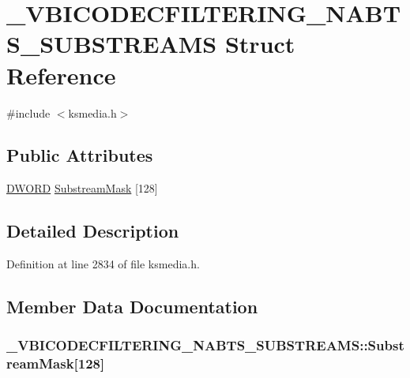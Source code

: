 \hypertarget{struct___v_b_i_c_o_d_e_c_f_i_l_t_e_r_i_n_g___n_a_b_t_s___s_u_b_s_t_r_e_a_m_s}{}\section{\+\_\+\+V\+B\+I\+C\+O\+D\+E\+C\+F\+I\+L\+T\+E\+R\+I\+N\+G\+\_\+\+N\+A\+B\+T\+S\+\_\+\+S\+U\+B\+S\+T\+R\+E\+A\+MS Struct Reference}
\label{struct___v_b_i_c_o_d_e_c_f_i_l_t_e_r_i_n_g___n_a_b_t_s___s_u_b_s_t_r_e_a_m_s}


{\ttfamily \#include $<$ksmedia.\+h$>$}

\subsection*{Public Attributes}
\begin{DoxyCompactItemize}
\item 
\hyperlink{mapinls_8h_ad342ac907eb044443153a22f964bf0af}{D\+W\+O\+RD} \hyperlink{struct___v_b_i_c_o_d_e_c_f_i_l_t_e_r_i_n_g___n_a_b_t_s___s_u_b_s_t_r_e_a_m_s_a9233ff314bd529645107c55860d67ee5}{Substream\+Mask} \mbox{[}128\mbox{]}
\end{DoxyCompactItemize}


\subsection{Detailed Description}


Definition at line 2834 of file ksmedia.\+h.



\subsection{Member Data Documentation}
\subsubsection[{\texorpdfstring{Substream\+Mask}{SubstreamMask}}]{ \+\_\+\+V\+B\+I\+C\+O\+D\+E\+C\+F\+I\+L\+T\+E\+R\+I\+N\+G\+\_\+\+N\+A\+B\+T\+S\+\_\+\+S\+U\+B\+S\+T\+R\+E\+A\+M\+S\+::\+Substream\+Mask\mbox{[}128\mbox{]}}\hypertarget{struct___v_b_i_c_o_d_e_c_f_i_l_t_e_r_i_n_g___n_a_b_t_s___s_u_b_s_t_r_e_a_m_s_a9233ff314bd529645107c55860d67ee5}{}\label{struct___v_b_i_c_o_d_e_c_f_i_l_t_e_r_i_n_g___n_a_b_t_s___s_u_b_s_t_r_e_a_m_s_a9233ff314bd529645107c55860d67ee5}


